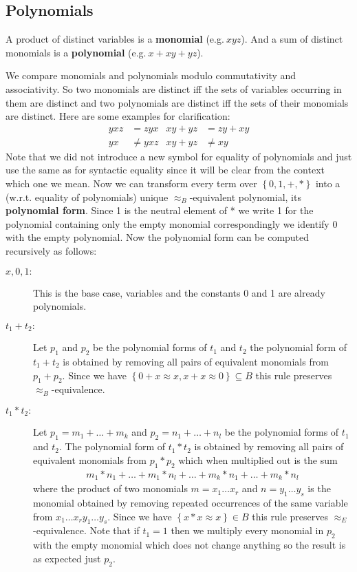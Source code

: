 	\subsection{Polynomials}
	\begin{definition}
		A product of distinct variables is a \textbf{monomial} (e.g.$\ xyz$). And a sum of distinct monomials is a \textbf{polynomial} (e.g.$\ x+xy+yz$).
	\end{definition}
	We compare monomials and polynomials modulo commutativity and associativity. So two monomials are distinct iff the sets of variables occurring in them are distinct and two polynomials are distinct iff the sets of their monomials are distinct.
	Here are some examples for clarification:
	\begin{align*}
		yxz & =zyx     & xy+yz & =zy+xy\\
		yx  & \neq yxz & xy+yz & \neq xy 
	\end{align*}
	Note that we did not introduce a new symbol for equality of polynomials and just use the same as for syntactic equality since it will be clear from the context which one we mean. Now we can transform every term over $\left\lbrace 0,1,+,*\right\rbrace$ 
	 into a (w.r.t. equality of polynomials) unique $\approx_B$-equivalent polynomial, its \textbf{polynomial form}. Since 1 is the neutral element of * we write 1 for the polynomial containing only the empty monomial correspondingly we identify 0 with the empty polynomial. Now the polynomial form can be computed recursively as follows:
	\begin{description}
		\item[$x,0,1:$] This is the base case, variables and the constants 0 and 1 are already polynomials.
		\item[$t_1+t_2:$] Let $p_1$ and $p_2$ be the polynomial forms of $t_1$ and $t_2$ the polynomial form of $t_1+t_2$ is obtained by removing all pairs of equivalent monomials from $p_1+p_2$. Since we have $\left\lbrace0+x\approx x,x+x\approx0\right\rbrace\subseteq B$  this rule preserves $\approx_B$-equivalence.
		\item[$t_1*t_2:$]  Let $p_1=m_1+\dots+m_k$ and $p_2=n_1+\dots+n_l$ be the polynomial forms of $t_1$ and $t_2$. The polynomial form of $t_1*t_2$ is obtained by removing all pairs of equivalent monomials from $p_1*p_2$ which when multiplied out is the sum
		\begin{align*}
			m_1*n_1+\dots+m_1*n_l+\dots+m_k*n_1+\dots+m_k*n_l 
		\end{align*} 
		where the product of two monomials $m=x_1\dots x_r$ and $n=y_1\dots y_s$ is the monomial obtained by removing repeated occurrences of the same variable from $x_1\dots x_r y_1\dots y_s$. Since we have $\left\lbrace x*x\approx x\right\rbrace\in B$  this rule preserves $\approx_E$-equivalence. Note that if $t_1=1$ then we multiply every monomial in $p_2$ with the empty monomial which does not change anything so the result is as expected just $p_2$.
	\end{description}
